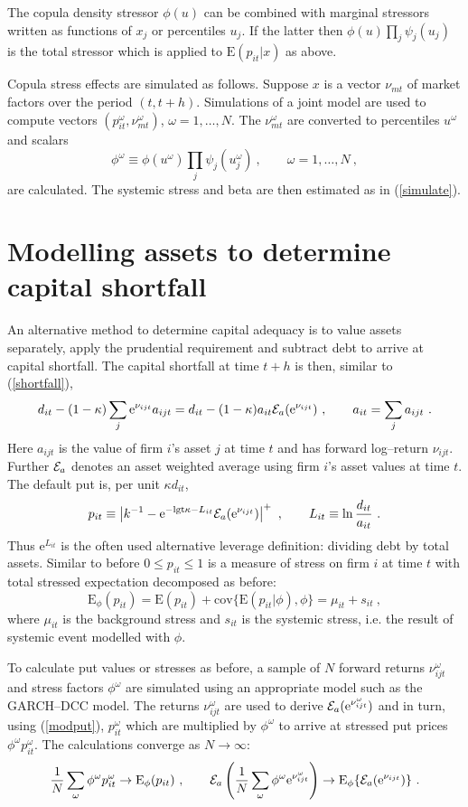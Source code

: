 \documentclass[authoryear]{elsarticle}
\newcommand{\logit}{\mathrm{lgt}}
\newcommand{\E}{\mathrm{E}}
\newcommand{\e}{\mathrm{e}}
\renewcommand{\o}{\omega}
\newcommand{\cov}{\mathrm{cov}}
\newcommand{\Ex}{{\cal E}}
\newcommand{\Es}{\E_\phi}
\newcommand{\eref}[1]{(\ref{#1})}
\newcommand{\cq}{\ , \qquad}
\newcommand{\be}[1]{\begin{equation}\label{#1}}
\newcommand{\ee}{\end{equation}}
\begin{document}
The copula density stressor $\phi(u)$  can be combined with marginal stressors written as functions of $x_j$ or  percentiles $u_j$.  If the latter then $\phi(u)\prod_j\psi_j(u_j)$ is the total stressor which is applied to $\E(p_{it}|x)$ as above.

Copula stress effects are simulated as follows.   Suppose $x$ is a vector $\nu_{mt}$ of  market factors  over the period $(t,t+h)$.   Simulations of a joint model are  used to  compute vectors $(p_{it}^\o,\nu_{mt}^\o)$, $ \o=1,\ldots, N$.  The $\nu_{mt}^\o$ are  converted to percentiles $u^\o$ and scalars
$$
\phi^\o\equiv\phi(u^\o)\prod_j\psi_j(u_j^\o)\cq \o=1,\ldots, N\ ,
$$
are calculated. The systemic stress and beta are then estimated as in \eref{simulate}.



\section{Modelling assets to determine capital shortfall}\label{riskmethod}

An alternative method to determine capital adequacy is to value  assets separately, apply the prudential requirement and subtract debt to arrive at capital shortfall.   The capital shortfall at time $t+h$ is then, similar to \eref{shortfall},
\be{csrwa}
d_{it} - (1-\kappa)\sum_j \e^{\nu_{ijt}}a_{ijt}  = d_{it} - (1-\kappa)a_{it}\Ex_a(\e^{\nu_{ijt}})\cq a_{it}=\sum_j a_{ijt}\ .
\ee
Here $a_{ijt}$ is the value of firm $i$'s asset  $j$ at time $t$ and has forward log--return $\nu_{ijt}$.  Further  $\Ex_a$ denotes an asset weighted average using  firm $i$'s asset values at time $t$. The default put is, per unit $\kappa d_{it}$,
\be{modput}
p_{it}\equiv \left|k^{-1} - \e^{-\logit\kappa-L_{it}}\Ex_a(\e^{\nu_{ijt}})\right|^+ \cq L_{it}\equiv \ln\frac{d_{it}}{a_{it}} \ .
\ee
Thus $\e^{L_{it}}$ is the often used alternative leverage definition: dividing debt by total assets.   Similar to before $0\le p_{it}\le 1$ is a measure of  stress on firm $i$ at time $t$ with total stressed expectation decomposed as before:
$$
\Es(p_{it}) = \E(p_{it}) + \cov\{\E(p_{it}|\phi),\phi\} = \mu_{it} + s_{it}\ ,
$$
where $\mu_{it}$ is the background stress and $s_{it}$ is the systemic stress, i.e. the result of systemic event modelled with $\phi$.

To calculate put values or stresses as before, a sample of $N$ forward returns $\nu_{ijt}^\o$ and stress factors $\phi^\o$ are  simulated using an appropriate model such as the GARCH--DCC model.   The returns $\nu_{ijt}^\o$ are used to derive $\Ex_a(\e^{\nu_{ijt}^\o})$ and in turn, using \eref{modput},   $p_{it}^\o$ which are multiplied by $\phi^\o$ to arrive at stressed put prices  $\phi^\o p_{it}^\o$.  The calculations converge as $N\rightarrow\infty$:
\be{rwa}
\frac{1}{N}\sum_\o \phi^\o p_{it}^\o\rightarrow \Es(p_{it})\cq \Ex_a\left( \frac{1}{N}\sum_\o\phi^\o\e^{\nu_{ijt}^\o}\right)\rightarrow \Es\{\Ex_a(\e^{\nu_{ijt}})\}\ .
\ee
\end{document}
